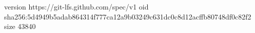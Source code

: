 version https://git-lfs.github.com/spec/v1
oid sha256:5d4949b5adab864314f777ca12a9b03249c631dc0c8d12acffb80748df0c82f2
size 43840
